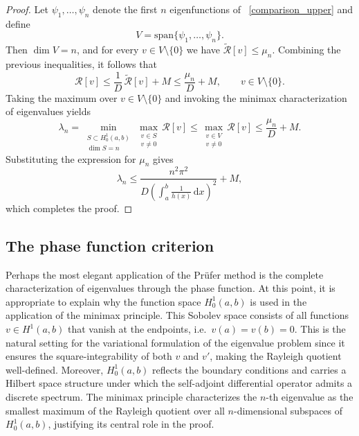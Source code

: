 \documentclass[11pt, reqno]{amsart}
\numberwithin{equation}{section}  %
\theoremstyle{plain}
\theoremstyle{definition}
\theoremstyle{remark}
\begin{document}
\begin{proof}
Let $\psi_1,\dots,\psi_n$ denote the first $n$ eigenfunctions of ~\eqref{comparison_upper} and define
\[
V=\mathrm{span}\{\psi_1,\dots,\psi_n\}.
\]
Then $\dim V=n$, and for every $v\in V\setminus\{0\}$ we have
\(
\tilde{\mathcal{R}}[v]\le\mu_n
\).
Combining the previous inequalities, it follows that
\[
\mathcal{R}[v]
\le
\frac{1}{D}\,\tilde{\mathcal{R}}[v] + M
\le
\frac{\mu_n}{D} + M,
\qquad v\in V\setminus\{0\}.
\]
Taking the maximum over $v\in V\setminus\{0\}$ and invoking the minimax characterization of eigenvalues yields
\[
\lambda_n
=
\min_{\substack{S\subset H_0^1(a,b)\\ \dim S=n}}
\max_{\substack{v\in S\\ v\neq 0}}
\mathcal{R}[v]
\le
\max_{\substack{v\in V\\ v\neq 0}}
\mathcal{R}[v]
\le
\frac{\mu_n}{D} + M.
\]
Substituting the expression for $\mu_n$ gives
\[
\lambda_n
\le
\frac{n^2\pi^2}
     {D\left(\displaystyle\int_a^b \frac{1}{h(x)}\,\mathrm{d}x\right)^2}
+ M,
\]
which completes the proof.
\qedhere
\end{proof}

\subsection{The phase function criterion}
Perhaps the most elegant application of the Pr\"ufer method is the complete characterization of eigenvalues through the phase function. At this point, it is appropriate to explain why the function space \( H_0^1(a,b) \) is used in the application of the minimax principle. This Sobolev space consists of all functions \( v \in H^1(a,b) \) that vanish at the endpoints, i.e.\ \( v(a) = v(b) = 0 \). This is the natural setting for the variational formulation of the eigenvalue problem since it ensures the square-integrability of both \( v \) and \( v' \), making the Rayleigh quotient well-defined. Moreover, \( H_0^1(a,b) \) reflects the boundary conditions and carries a Hilbert space structure under which the self-adjoint differential operator admits a discrete spectrum. The minimax principle characterizes the \(n\)-th eigenvalue as the smallest maximum of the Rayleigh quotient over all \(n\)-dimensional subspaces of \( H_0^1(a,b) \), justifying its central role in the proof.
\end{document}
